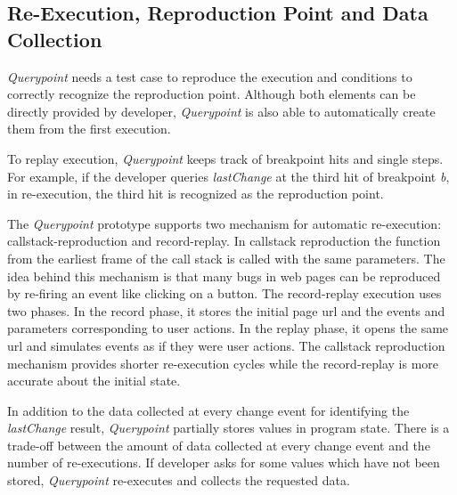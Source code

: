 \documentclass{sig-alternate}
\begin{document}
\subsection{Re-Execution, Reproduction Point and Data Collection}
\textit{Querypoint} needs a test case to reproduce the
execution and conditions to correctly recognize the reproduction point. 
Although both elements can be directly provided by developer, \textit{Querypoint}
is also able to automatically create them from the first execution. 

To replay execution, \textit{Querypoint} keeps track of breakpoint hits and single steps. For example, 
if the developer queries \textit{lastChange} at the third hit of breakpoint \textit{b}, in
re-execution, the third hit is recognized as the reproduction point. 

The \textit{Querypoint} prototype supports two mechanism
for automatic re-execution: callstack-reproduction and record-replay. In callstack reproduction the function from
the earliest frame of the call stack is called with the same parameters. The idea
behind this mechanism is that many bugs in web pages can be reproduced by re-firing
an event like clicking on a button. The record-replay execution uses two phases. In the record phase, it 
stores the initial page url and the events and parameters corresponding to user actions. In the replay phase, it opens
the same url and simulates events as if they were user actions. The callstack reproduction mechanism provides
shorter re-execution cycles while the record-replay is more accurate about the
initial state.

In addition to the data collected at every change event for identifying the \textit{lastChange}
result, \textit{Querypoint} partially stores values in program state. There is a trade-off between the amount of data collected at every change event and the number of re-executions. If developer asks for 
some values which have not been stored, \textit{Querypoint} re-executes and collects the requested data. 


\end{document}
